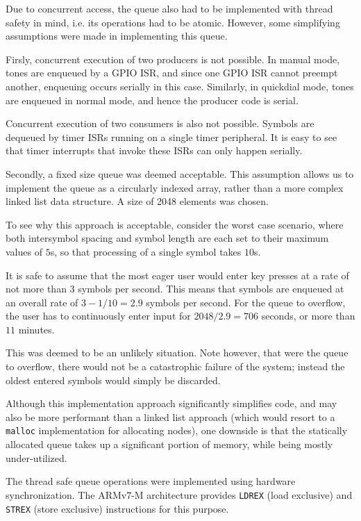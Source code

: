 \documentclass[11pt,a4paper,twocolumn]{scrartcl}
\begin{document}
Due to concurrent access, the queue also had to be implemented with thread safety in mind, i.e. its operations had to be atomic. However, some simplifying assumptions were made in implementing this queue.

Firsly, concurrent execution of two producers is not possible. In manual mode, tones are enqueued by a GPIO ISR, and since one GPIO ISR cannot preempt another, enqueuing occurs serially in this case. Similarly, in quickdial mode, tones are enqueued in normal mode, and hence the producer code is serial.

Concurrent execution of two consumers is also not possible. Symbols are dequeued by timer ISRs running on a single timer peripheral. It is easy to see that timer interrupts that invoke these ISRs can only happen serially.

Secondly, a fixed size queue was deemed acceptable. This assumption allows us to implement the queue as a circularly indexed array, rather than a more complex linked list data structure. A size of 2048 elements was chosen.

To see why this approach is acceptable, consider the worst case scenario, where both intersymbol spacing and symbol length are each set to their maximum values of $5$s, so that processing of a single symbol takes $10$s. 

It is safe to assume that the most eager user would enter key presses at a rate of not more than $3$ symbols per second. This means that symbols are enqueued at an overall rate of $3 - 1/10 = 2.9$ symbols per second. For the queue to overflow, the user has to continuously enter input for $2048/2.9 = 706$ seconds, or more than $11$ minutes.

This was deemed to be an unlikely situation. Note however, that were the queue to overflow, there would not be a catastrophic failure of the system; instead the oldest entered symbols would simply be discarded.

Although this implementation approach significantly simplifies code, and may also be more performant than a linked list approach (which would resort to a \verb!malloc! implementation for allocating nodes), one downside is that the statically allocated queue takes up a significant portion of memory, while being mostly under-utilized.

The thread safe queue operations were implemented using hardware synchronization. The ARMv7-M architecture provides \verb!LDREX! (load exclusive) and \verb!STREX! (store exclusive) instructions for this purpose.
\end{document}
